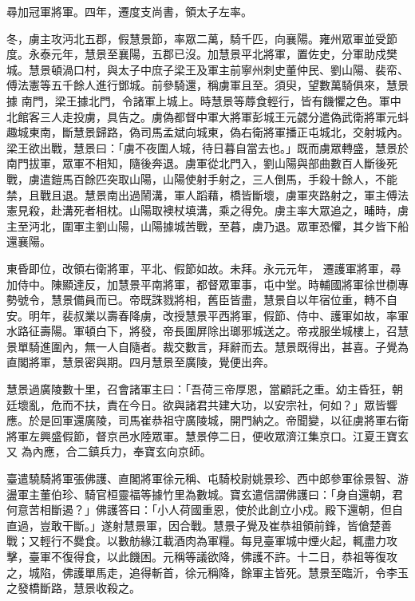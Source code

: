 \begin{pinyinscope}
 尋加冠軍將軍。四年，遷度支尚書，領太子左率。



 冬，虜主攻沔北五郡，假慧景節，率眾二萬，騎千匹，向襄陽。雍州眾軍並受節度。永泰元年，慧景至襄陽，五郡已沒。加慧景平北將軍，置佐史，分軍助戍樊城。慧景頓渦口村，與太子中庶子梁王及軍主前寧州刺史董仲民、劉山陽、裴帟、傅法憲等五千餘人進行鄧城。前參騎還，稱虜軍且至。須臾，望數萬騎俱來，慧景據
 南門，梁王據北門，令諸軍上城上。時慧景等蓐食輕行，皆有饑懼之色。軍中北館客三人走投虜，具告之。虜偽都督中軍大將軍彭城王元勰分遣偽武衛將軍元蚪趣城東南，斷慧景歸路，偽司馬孟斌向城東，偽右衛將軍播正屯城北，交射城內。梁王欲出戰，慧景曰：「虜不夜圍人城，待日暮自當去也。」既而虜眾轉盛，慧景於南門拔軍，眾軍不相知，隨後奔退。虜軍從北門入，劉山陽與部曲數百人斷後死戰，虜遣鎧馬百餘匹突取山陽，山陽使射手射之，三人倒馬，手殺十餘人，不能禁，且戰且退。慧景南出過鬧溝，軍人蹈藉，橋皆斷壞，虜軍夾路射之，軍主傅法憲見殺，赴溝死者相枕。山陽取襖杖填溝，乘之得免。虜主率大眾追之，晡時，虜主至沔北，圍軍主劉山陽，山陽據城苦戰，至暮，虜乃退。眾軍恐懼，其夕皆下船還襄陽。



 東昏即位，改領右衛將軍，平北、假節如故。未拜。永元元年，
 遷護軍將軍，尋加侍中。陳顯達反，加慧景平南將軍，都督眾軍事，屯中堂。時輔國將軍徐世檦專勢號令，慧景備員而已。帝既誅戮將相，舊臣皆盡，慧景自以年宿位重，轉不自安。明年，裴叔業以壽春降虜，改授慧景平西將軍，假節、侍中、護軍如故，率軍水路征壽陽。軍頓白下，將發，帝長圍屏除出瑯邪城送之。帝戎服坐城樓上，召慧景單騎進圍內，無一人自隨者。裁交數言，拜辭而去。慧景既得出，甚喜。子覺為直閣將軍，慧景密與期。四月慧景至廣陵，覺便出奔。



 慧景過廣陵數十里，召會諸軍主曰：「吾荷三帝厚恩，當顧託之重。幼主昏狂，朝廷壞亂，危而不扶，責在今日。欲與諸君共建大功，以安宗社，何如？」眾皆響應。於是回軍還廣陵，司馬崔恭祖守廣陵城，開門納之。帝聞變，以征虜將軍右衛將軍左興盛假節，督京邑水陸眾軍。慧景停二日，便收眾濟江集京口。江夏王寶玄又
 為內應，合二鎮兵力，奉寶玄向京師。



 臺遣驍騎將軍張佛護、直閣將軍徐元稱、屯騎校尉姚景珍、西中郎參軍徐景智、游盪軍主董伯珍、騎官桓靈福等據竹里為數城。寶玄遣信謂佛護曰：「身自還朝，君何意苦相斷遏？」佛護答曰：「小人荷國重恩，使於此創立小戍。殿下還朝，但自直過，豈敢干斷。」遂射慧景軍，因合戰。慧景子覺及崔恭祖領前鋒，皆傖楚善戰；又輕行不爨食。以數舫緣江載酒肉為軍糧。每見臺軍城中煙火起，輒盡力攻擊，臺軍不復得食，以此饑困。元稱等議欲降，佛護不許。十二日，恭祖等復攻之，城陷，佛護單馬走，追得斬首，徐元稱降，餘軍主皆死。慧景至臨沂，令李玉之發橋斷路，慧景收殺之。




\end{pinyinscope}
